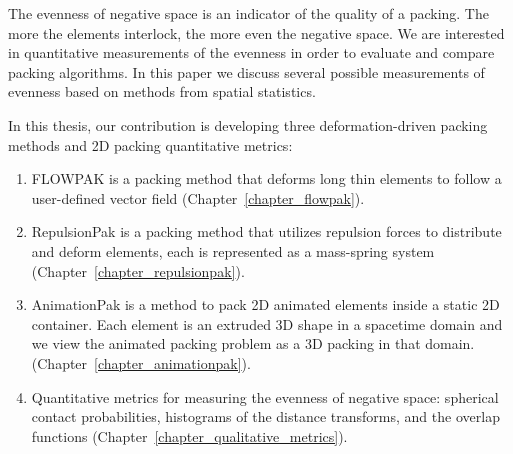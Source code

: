 \newtext
{
The evenness of negative space is an indicator of the quality of a packing.
The more the elements interlock, the more even the negative space. %
We are interested in quantitative measurements of the evenness 
in order to evaluate and compare packing algorithms.
In this paper we discuss several possible measurements of 
evenness based on methods from spatial statistics.
}

\newtext
{
In this thesis, our contribution is developing three deformation-driven packing methods and 2D packing quantitative metrics:
\begin{enumerate}
\item FLOWPAK is a packing method that deforms long thin elements to follow a user-defined vector field (Chapter~\ref{chapter_flowpak}).
\item RepulsionPak is a packing method that utilizes repulsion forces to distribute and deform elements,
	each is represented as a mass-spring system (Chapter~\ref{chapter_repulsionpak}).
\item AnimationPak is a method to pack 2D animated elements inside a static 2D container. 
	Each element is an extruded 3D shape in a spacetime domain 
	and we view the animated packing problem as a 3D packing in that domain.
	(Chapter~\ref{chapter_animationpak}). 
\item  Quantitative metrics for measuring the evenness of negative space: spherical contact probabilities,
histograms of the distance transforms, and the overlap functions (Chapter~\ref{chapter_qualitative_metrics}). 
\end{enumerate}
}





